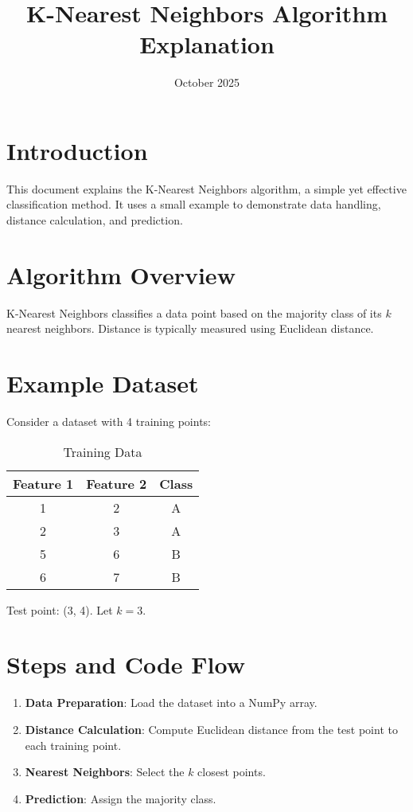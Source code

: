\documentclass{article}
\newcommand{\knn}{K-Nearest Neighbors}
\begin{document}
\title{\knn{} Algorithm Explanation}
\author{}
\date{October 2025}
\maketitle

\section{Introduction}
This document explains the \knn{} algorithm, a simple yet effective classification method. It uses a small example to demonstrate data handling, distance calculation, and prediction.

\section{Algorithm Overview}
\knn{} classifies a data point based on the majority class of its $k$ nearest neighbors. Distance is typically measured using Euclidean distance.

\section{Example Dataset}
Consider a dataset with 4 training points:
\begin{table}[h]
    \centering
    \begin{tabular}{ccc}
        \toprule
        Feature 1 & Feature 2 & Class \\
        \midrule
        1 & 2 & A \\
        2 & 3 & A \\
        5 & 6 & B \\
        6 & 7 & B \\
        \bottomrule
    \end{tabular}
    \caption{Training Data}
\end{table}

Test point: (3, 4). Let $k = 3$.

\section{Steps and Code Flow}
\begin{enumerate}
    \item \textbf{Data Preparation}: Load the dataset into a NumPy array.
    \item \textbf{Distance Calculation}: Compute Euclidean distance from the test point to each training point.
    \item \textbf{Nearest Neighbors}: Select the $k$ closest points.
    \item \textbf{Prediction}: Assign the majority class.
\end{enumerate}
\end{document}
